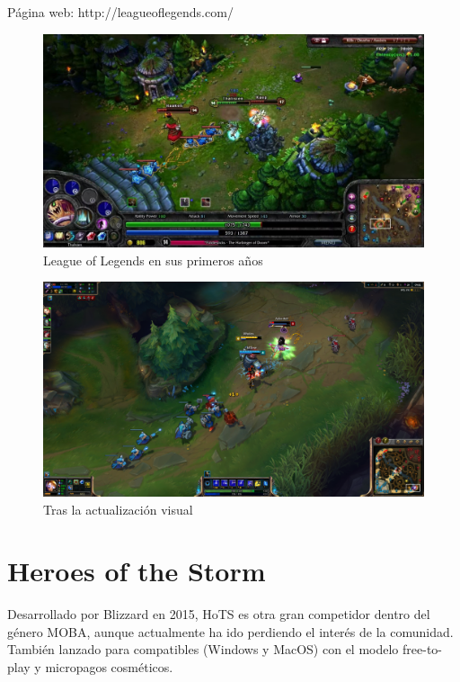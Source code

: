 Página web: http://leagueoflegends.com/

\begin{figure}[H]
    \centering
    \includegraphics[width=0.95\columnwidth]{images/lol1.jpg}    
    \caption{League of Legends en sus primeros años}
\end{figure}

\begin{figure}[H]
    \centering
    \includegraphics[width=0.95\columnwidth]{images/lol2.png}
    \caption{Tras la actualización visual}
\end{figure}


\newpage

\section{Heroes of the Storm}

Desarrollado por Blizzard en 2015, HoTS es otra gran competidor dentro del género MOBA, aunque actualmente ha ido perdiendo el interés de la comunidad. También lanzado para compatibles (Windows y MacOS) con el modelo free-to-play y micropagos cosméticos.

